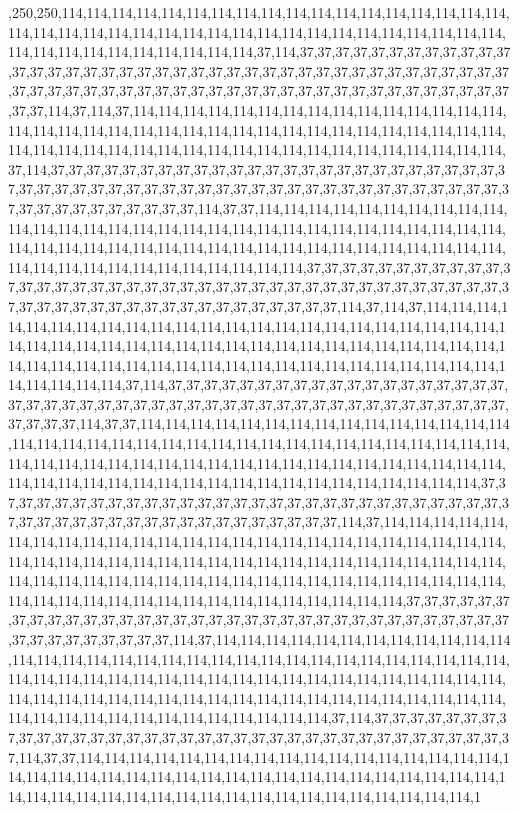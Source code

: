 ,250,250,114,114,114,114,114,114,114,114,114,114,114,114,114,114,114,114,114,114,114,114,114,114,114,114,114,114,114,114,114,114,114,114,114,114,114,114,114,114,114,114,114,114,114,114,114,114,114,114,37,114,37,37,37,37,37,37,37,37,37,37,37,37,37,37,37,37,37,37,37,37,37,37,37,37,37,37,37,37,37,37,37,37,37,37,37,37,37,37,37,37,37,37,37,37,37,37,37,37,37,37,37,37,37,37,37,37,37,37,37,37,37,37,37,37,37,37,37,37,37,37,114,37,114,37,114,114,114,114,114,114,114,114,114,114,114,114,114,114,114,114,114,114,114,114,114,114,114,114,114,114,114,114,114,114,114,114,114,114,114,114,114,114,114,114,114,114,114,114,114,114,114,114,114,114,114,114,114,114,114,37,114,37,37,37,37,37,37,37,37,37,37,37,37,37,37,37,37,37,37,37,37,37,37,37,37,37,37,37,37,37,37,37,37,37,37,37,37,37,37,37,37,37,37,37,37,37,37,37,37,37,37,37,37,37,37,37,37,37,37,37,37,37,37,37,37,114,37,37,114,114,114,114,114,114,114,114,114,114,114,114,114,114,114,114,114,114,114,114,114,114,114,114,114,114,114,114,114,114,114,114,114,114,114,114,114,114,114,114,114,114,114,114,114,114,114,114,114,114,114,114,114,114,114,114,114,114,114,114,114,114,37,37,37,37,37,37,37,37,37,37,37,37,37,37,37,37,37,37,37,37,37,37,37,37,37,37,37,37,37,37,37,37,37,37,37,37,37,37,37,37,37,37,37,37,37,37,37,37,37,37,37,37,37,37,37,37,37,37,114,37,114,37,114,114,114,114,114,114,114,114,114,114,114,114,114,114,114,114,114,114,114,114,114,114,114,114,114,114,114,114,114,114,114,114,114,114,114,114,114,114,114,114,114,114,114,114,114,114,114,114,114,114,114,114,114,114,114,114,114,114,114,114,114,114,114,114,114,114,114,114,37,114,37,37,37,37,37,37,37,37,37,37,37,37,37,37,37,37,37,37,37,37,37,37,37,37,37,37,37,37,37,37,37,37,37,37,37,37,37,37,37,37,37,37,37,37,37,37,37,37,37,37,37,114,37,37,114,114,114,114,114,114,114,114,114,114,114,114,114,114,114,114,114,114,114,114,114,114,114,114,114,114,114,114,114,114,114,114,114,114,114,114,114,114,114,114,114,114,114,114,114,114,114,114,114,114,114,114,114,114,114,114,114,114,114,114,114,114,114,114,114,114,114,114,114,114,114,114,114,114,37,37,37,37,37,37,37,37,37,37,37,37,37,37,37,37,37,37,37,37,37,37,37,37,37,37,37,37,37,37,37,37,37,37,37,37,37,37,37,37,37,37,37,37,37,37,37,37,114,37,114,114,114,114,114,114,114,114,114,114,114,114,114,114,114,114,114,114,114,114,114,114,114,114,114,114,114,114,114,114,114,114,114,114,114,114,114,114,114,114,114,114,114,114,114,114,114,114,114,114,114,114,114,114,114,114,114,114,114,114,114,114,114,114,114,114,114,114,114,114,114,114,114,114,114,114,114,114,114,114,114,37,37,37,37,37,37,37,37,37,37,37,37,37,37,37,37,37,37,37,37,37,37,37,37,37,37,37,37,37,37,37,37,37,37,37,37,37,37,37,37,37,37,37,114,37,114,114,114,114,114,114,114,114,114,114,114,114,114,114,114,114,114,114,114,114,114,114,114,114,114,114,114,114,114,114,114,114,114,114,114,114,114,114,114,114,114,114,114,114,114,114,114,114,114,114,114,114,114,114,114,114,114,114,114,114,114,114,114,114,114,114,114,114,114,114,114,114,114,114,114,114,114,114,114,114,114,114,114,114,114,37,114,37,37,37,37,37,37,37,37,37,37,37,37,37,37,37,37,37,37,37,37,37,37,37,37,37,37,37,37,37,37,37,37,37,37,37,37,114,37,37,114,114,114,114,114,114,114,114,114,114,114,114,114,114,114,114,114,114,114,114,114,114,114,114,114,114,114,114,114,114,114,114,114,114,114,114,114,114,114,114,114,114,114,114,114,114,114,114,114,114,114,114,114,114,114,114,1